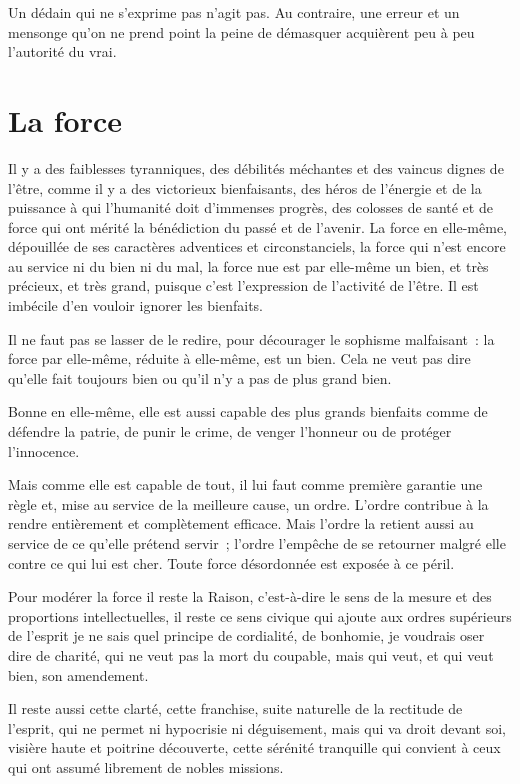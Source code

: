 \documentclass[french,twoside]{book} %
\newcommand{\astermono}{\medskip\centerline{\color{rubric}\large\selectfont{\syms ✻}}\medskip\par}%
\begin{document}
\astermono

\noindent Un dédain qui ne s’exprime pas n’agit pas. Au contraire, une erreur et un mensonge qu’on ne prend point la peine de démasquer acquièrent peu à peu l’autorité du vrai.
\section[{La force}]{La force}
\noindent Il y a des faiblesses tyranniques, des débilités méchantes et des vaincus dignes de l’être, comme il y a des victorieux bienfaisants, des héros de l’énergie et de la puissance à qui l’humanité doit d’immenses progrès, des colosses de santé et de force qui ont mérité la bénédiction du passé et de l’avenir. La force en elle-même, dépouillée de ses caractères adventices et circonstanciels, la force qui n’est encore au service ni du bien ni du mal, la force nue est par elle-même un bien, et très précieux, et très grand, puisque c’est l’expression de l’activité de l’être. Il est imbécile d’en vouloir ignorer les bienfaits.\par

\astermono

\noindent Il ne faut pas se lasser de le redire, pour décourager le sophisme malfaisant : la force par elle-même, réduite à elle-même, est un bien. Cela ne veut pas dire qu’elle fait toujours bien ou qu’il n’y a pas de plus grand bien.\par
Bonne en elle-même, elle est aussi capable des plus grands bienfaits comme de défendre la patrie, de punir le crime, de venger l’honneur ou de protéger l’innocence.\par
Mais comme elle est capable de tout, il lui faut comme première garantie une règle et, mise au service de la meilleure cause, un ordre. L’ordre contribue à la rendre entièrement et complètement efficace. Mais l’ordre la retient aussi au service de ce qu’elle prétend servir ; l’ordre l’empêche de se retourner malgré elle contre ce qui lui est cher. Toute force désordonnée est exposée à ce péril.\par

\astermono

\noindent Pour modérer la force il reste la Raison, c’est-à-dire le sens de la mesure et des proportions intellectuelles, il reste ce sens civique qui ajoute aux ordres supérieurs de l’esprit je ne sais quel principe de cordialité, de bonhomie, je voudrais oser dire de charité, qui ne veut pas la mort du coupable, mais qui veut, et qui veut bien, son amendement.\par
Il reste aussi cette clarté, cette franchise, suite naturelle de la rectitude de l’esprit, qui ne permet ni hypocrisie ni déguisement, mais qui va droit devant soi, visière haute et poitrine découverte, cette sérénité tranquille qui convient à ceux qui ont assumé librement de nobles missions.\par
\end{document}
